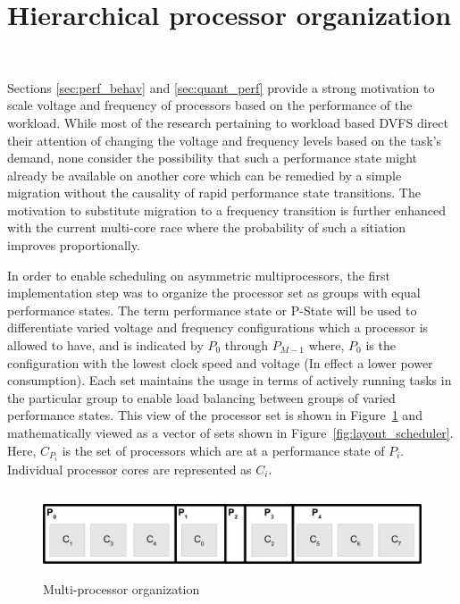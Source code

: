 \section{Hierarchical processor organization}~\label{sec:proc_org}

Sections \ref{sec:perf_behav} and \ref{sec:quant_perf}  provide a strong motivation to
scale voltage and frequency of processors based on the performance of the workload.
While most of the research pertaining to workload based DVFS direct their attention of changing the voltage and frequency levels
based on the task's demand, none consider the possibility that such a performance state might
already be available on another core which can be remedied by a simple migration without the 
causality of rapid performance state transitions. The motivation to substitute migration to
a frequency transition is further enhanced with the current multi-core race where the probability
of such a sitiation improves proportionally.  

In order to enable scheduling on asymmetric multiprocessors, the first implementation
step was to organize the processor set as groups with equal performance states. 
The term performance state or P-State will be used to differentiate varied voltage and
frequency configurations which a processor is allowed to have, and is indicated by
$P_{0}$ through $P_{M-1}$ where, $P_0$ is the configuration with the lowest clock speed
and voltage (In effect a lower power consumption). Each set maintains the usage in terms
of actively running tasks in the particular group to enable load balancing between 
groups of varied performance states. This view of the processor set is shown in
Figure~\ref{fig:processor_groups} and mathematically viewed as a vector of sets shown in Figure~\ref{fig:layout_scheduler}.
Here, $C_{P_{i}}$ is the set of processors which are at 
a performance state of $P_{i}$. Individual processor cores are represented as $C_{i}$.


\begin{figure}[h!]
  \begin{center}
    \includegraphics[height=1in]{figures/Processor_Organization.jpg}%
    \caption{Multi-processor organization}
    \label{fig:processor_groups}
  \end{center}
\end{figure}

